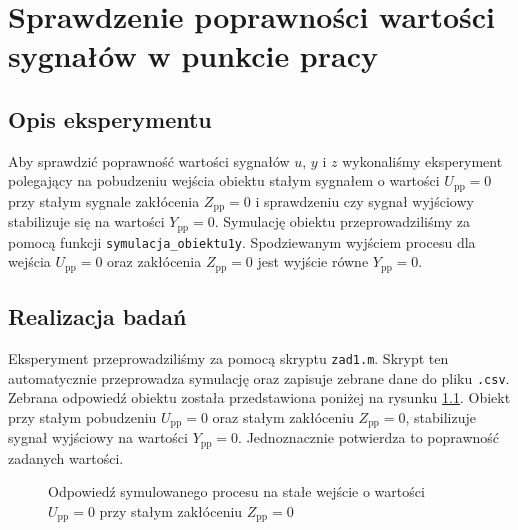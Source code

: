 \chapter{Sprawdzenie poprawności wartości sygnałów w punkcie pracy}
\label{zad1}

\section{Opis eksperymentu}
\label{zad1_opis}
Aby sprawdzić poprawność wartości sygnałów $u$, $y$ i $z$ wykonaliśmy eksperyment polegający na pobudzeniu wejścia obiektu stałym sygnałem o wartości $U_{\mathrm{pp}} = 0$ przy stałym sygnale zakłócenia $Z_{\mathrm{pp}} = 0$ i sprawdzeniu czy sygnał wyjściowy stabilizuje się na wartości $Y_{\mathrm{pp}}=\num{0}$. Symulację obiektu przeprowadziliśmy za pomocą funkcji \verb+symulacja_obiektu1y+. Spodziewanym wyjściem procesu dla wejścia $U_{\mathrm{pp}} = \num{0}$ oraz zakłócenia $Z_{\mathrm{pp}} = \num{0}$ jest wyjście równe $Y_{\mathrm{pp}} = \num{0}$.

\section{Realizacja badań}
\label{zad1_realizacja}
Eksperyment przeprowadziliśmy za pomocą skryptu \verb+zad1.m+. Skrypt ten automatycznie przeprowadza symulację oraz zapisuje zebrane dane do pliku \verb+.csv+. Zebrana odpowiedź obiektu została przedstawiona poniżej na rysunku \ref{zad1_output}. 
Obiekt przy stałym pobudzeniu $U_{\mathrm{pp}}=\num{0}$ oraz stałym zakłóceniu $Z_{\mathrm{pp}}=\num{0}$, stabilizuje sygnał wyjściowy na wartości $Y_{\mathrm{pp}}=\num{0}$.
Jednoznacznie potwierdza to poprawność zadanych wartości.

\begin{figure}[h]
    \label{zad1_output}
    \centering
    \caption{Odpowiedź symulowanego procesu na stałe wejście o wartości $U_{\mathrm{pp}}=\num{0}$ przy stałym zakłóceniu $Z_{\mathrm{pp}}=\num{0}$}
\end{figure}
